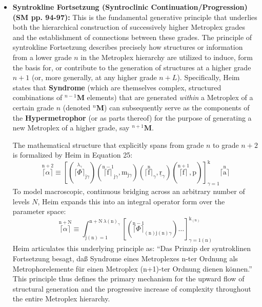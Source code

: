 \documentclass[12pt]{article}
\newcommand{\q}[1]{\enquote{#1}}
\newcommand{\metroplex}[1]{{}^{#1}\mathbf{M}}
\begin{document}
\begin{itemize}
    \item \textbf{Syntrokline Fortsetzung (Syntroclinic Continuation/Progression) (SM pp. 94-97):}
    This is the fundamental generative principle that underlies both the hierarchical construction of successively higher Metroplex grades and the establishment of connections between these grades. The principle of syntrokline Fortsetzung describes precisely how structures or information from a lower grade \( n \) in the Metroplex hierarchy are utilized to induce, form the basis for, or contribute to the generation of structures at a higher grade \( n+1 \) (or, more generally, at any higher grade \( n+L \)). Specifically, Heim states that \textbf{Syndrome} (which are themselves complex, structured combinations of \( \metroplex{n-1} \) elements) that are generated \textit{within} a Metroplex of a certain grade \( n \) (denoted \( \metroplex{n} \)) can subsequently serve as the components of the \textbf{Hypermetrophor} (or as parts thereof) for the purpose of generating a new Metroplex of a higher grade, say \( \metroplex{n+1} \). 
    
    The mathematical structure that explicitly spans from grade \( n \) to grade \( n+2 \) is formalized by Heim in Equation 25:
    \begin{equation}
    \overset{\mathrm{n}+2}{\lceil\alpha\rceil} \equiv \left[ ( \overset{\lambda_\gamma}{\lceil\Phi\rceil}_{\mathrm{j}\gamma} ) ( \overset{\mathrm{n}-1}{\lceil\mathrm{f}\rceil}_{\mathrm{j}\gamma}, \mathrm{m}_{\mathrm{j}\gamma} ) ( \overset{\mathrm{n}}{\lceil\mathrm{f}\rceil}_\gamma, \underline{\mathrm{r}}_\gamma ) ( \overset{\mathrm{n}+1}{\lceil\mathrm{f}\rceil}, \mathrm{p} ) \right]_{\gamma=1}^{\mathrm{k}} \overset{\mathrm{n}}{\lceil\mathrm{a}\rceil} \tag{25}
    \label{eq:original_syntroclinic_bridge_25}
    \end{equation}
    To model macroscopic, continuous bridging across an arbitrary number of levels \( N \), Heim expands this into an integral operator form over the parameter space:
    \begin{equation}
    \overset{\mathrm{n}+\mathrm{N}}{\lceil\alpha\rceil} \equiv \int_{\mathrm{j}(\mathrm{n})=1}^{\mathrm{n}+\mathrm{N} \ \lambda(\mathrm{n})_\gamma} \left[ ( \overset{\mathrm{n}-1}{\lceil\Phi\rceil}_{(\mathrm{n})\mathrm{j}(\mathrm{n})\gamma} ) \dots \right]_{\gamma=1(\mathrm{n})}^{\mathrm{k}_{(\mathrm{n})}} \tag{25a}
    \end{equation}
    Heim articulates this underlying principle as: \q{Das Prinzip der syntroklinen Fortsetzung besagt, daß Syndrome eines Metroplexes n-ter Ordnung als Metrophorelemente für einen Metroplex (n+1)-ter Ordnung dienen können.} This principle thus defines the primary mechanism for the upward flow of structural generation and the progressive increase of complexity throughout the entire Metroplex hierarchy.


\end{itemize}
\end{document}
